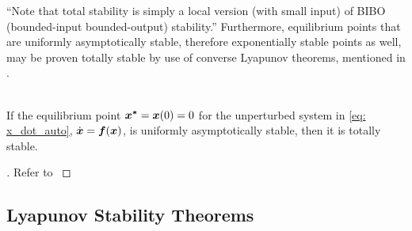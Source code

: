 \documentclass[12pt]{ucthesis}
\begin{document}
``Note that total stability is simply a local version (with small input) of BIBO (bounded-input bounded-output) stability.'' Furthermore, equilibrium points that are uniformly asymptotically stable, therefore exponentially stable points as well, may be proven totally stable by use of converse Lyapunov theorems, mentioned in .

\begin{thm} \alignright \citep[Thm. 4.14]{Slotine1991} \label{thm: total_stability}\\
	If the equilibrium point $\boldsymbol{x^*}=\boldsymbol{x}(0)=0$ for the unperturbed system in \autoref{eq: x_dot_auto}, $\dot{\boldsymbol{x}} = \boldsymbol{f}(\boldsymbol{x})$, is uniformly asymptotically stable, then it is totally stable.
\end{thm}

\begin{proof}[]
	Refer to \citet[Chp. 5, Stability of Perturbed Systems]{Khalil1996}
\end{proof}

\subsection{Lyapunov Stability Theorems}
\label{subsec: lyapunov_stab_theo}
\end{document}

